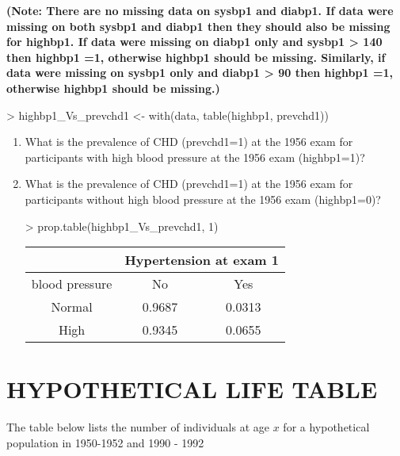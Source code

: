 \documentclass{article}
\begin{document}
\textbf{(Note: There are no missing data on sysbp1 and diabp1. If data were missing on both sysbp1 and diabp1 then they should also be missing for highbp1. If data were missing on diabp1 only and sysbp1 > 140 then highbp1 =1, otherwise highbp1 should be missing.  Similarly, if data were missing on sysbp1 only and diabp1 > 90 then highbp1 =1, otherwise highbp1 should be missing.)}

\begin{Schunk}
\begin{Sinput}
> highbp1_Vs_prevchd1 <- with(data, table(highbp1, prevchd1))
\end{Sinput}
\end{Schunk}


\begin{enumerate}
  \item What is the prevalence of CHD (prevchd1=1) at the 1956 exam for participants with high blood pressure at the 1956 exam (highbp1=1)?
  \item What is the prevalence of CHD (prevchd1=1) at the 1956 exam for participants without high blood pressure at the 1956 exam (highbp1=0)?

\begin{Schunk}
\begin{Sinput}
> prop.table(highbp1_Vs_prevchd1, 1)
\end{Sinput}
\end{Schunk}

\begin{table}[ht]
\begin{center}
\begin{tabular}{ccc}
& \multicolumn{2}{c}{Hypertension at exam 1}\\  
  \hline
blood pressure & No & Yes \\ 
  \hline
Normal & 0.9687 & 0.0313 \\ 
High & 0.9345 & 0.0655 \\ 
   \hline
\end{tabular}
\end{center}
\end{table}

\end{enumerate}

\pagebreak
\section{HYPOTHETICAL LIFE TABLE}

The table below lists the number of individuals at age \(x\) for a hypothetical
population in 1950-1952 and 1990 - 1992\\
\end{document}
